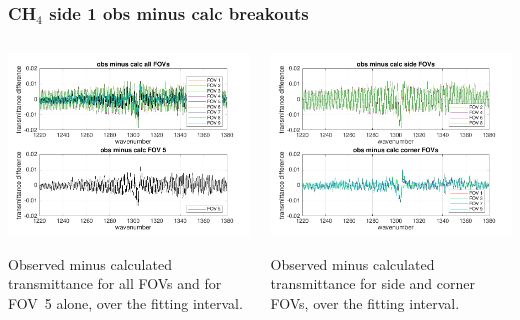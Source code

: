\documentclass[10pt]{beamer}
\begin{document}
\begin{frame}
\frametitle{CH$_4$ side 1 obs minus calc breakouts}
\begin{columns}[t]
\begin{column}{0.5\textwidth}
  \begin{centering}
  \includegraphics[width=\textwidth]{01-13_pfh_s1_CH4/CH4_breakout_1.png}
  \end{centering}\vspace{3mm}

Observed minus calculated transmittance for all FOVs and for FOV~5
alone, over the fitting interval.

\end{column}
\begin{column}{0.5\textwidth}  
  \begin{centering}
  \includegraphics[width=\textwidth]{01-13_pfh_s1_CH4/CH4_breakout_2.png}
  \end{centering}\vspace{3mm}

Observed minus calculated transmittance for side and corner FOVs,
over the fitting interval.

\end{column}
\end{columns}
\end{frame}
\end{document}
